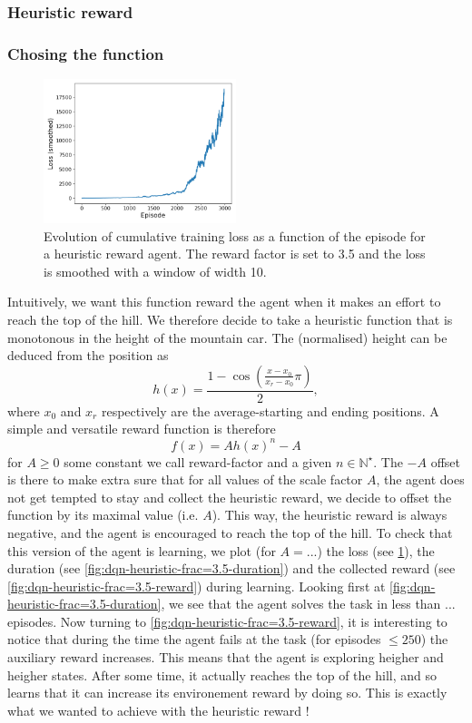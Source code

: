 \documentclass[a4paper, 12pt,oneside]{article}
\begin{document}
        \subsubsection{Heuristic reward}
        \subsubsection{Chosing the function}
        \begin{figure}
            \centering
            \vspace{-1em}
            \includegraphics[width=0.5\textwidth]{../runs/dqn_heuristic/up-tau=3_d=2_frac=3.5/figs/loss}
            \caption{Evolution of cumulative training loss as a function of the episode for a heuristic reward agent. The reward factor is set to 3.5 and the loss is smoothed with a window of width 10.}
            \label{fig:dqn-heuristic-frac=3.5-loss}
        \end{figure}
        Intuitively, we want this function reward the agent when it makes an effort to reach the top of the hill. We therefore decide to take a heuristic function that is monotonous in the height of the mountain car. The (normalised) height can be deduced from the position as
        $$
        h(x) = \frac{1-\cos\left(\frac{x-x_0}{x_r-x_0}\pi\right)}{2},
        $$
        where $x_0$ and $x_r$ respectively are the average-starting and ending positions. 
        A simple and versatile reward function is therefore  
        $$
        f(x) = Ah(x)^n - A
        $$
        for $A\ge 0$ some constant we call reward-factor and a given $n\in\mathbb N^\star$. The $-A$ offset is there to make extra sure that for all values of the scale factor $A$, the agent does not get tempted to stay and collect the heuristic reward, we decide to offset the function by its maximal value (i.e. $A$). This way, the heuristic reward is always negative, and the agent is encouraged to reach the top of the hill.
        To check that this version of the agent is learning, we plot (for $A=...$) the loss (see \ref{fig:dqn-heuristic-frac=3.5-loss}), the duration (see \ref{fig:dqn-heuristic-frac=3.5-duration}) and the collected reward (see \ref{fig:dqn-heuristic-frac=3.5-reward}) during learning. Looking first at \ref{fig:dqn-heuristic-frac=3.5-duration}, we see that the agent solves the task in less than ... episodes. Now turning to \ref{fig:dqn-heuristic-frac=3.5-reward}, it is interesting to notice that during the time the agent fails at the task (for episodes $\le 250$) the auxiliary reward increases. This means that the agent is exploring heigher and heigher states. After some time, it actually reaches the top of the hill, and so learns that it can increase its environement reward by doing so. This is exactly what we wanted to achieve with the heuristic reward !
\end{document}
